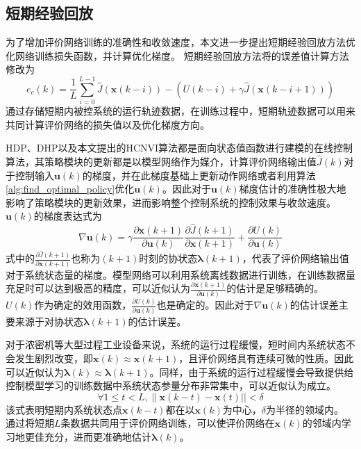 \subsection{短期经验回放}
为了增加评价网络训练的准确性和收敛速度，本文进一步提出短期经验回放方法优化网络训练损失函数，并计算优化梯度。
短期经验回放方法将的误差值计算方法修改为
\begin{equation}
\label{equ:TDerror_replay} e_{c}(k)=\frac{1}{L} \sum_{i=0}^{L-1}
\hat{J}(\pmb x(k-i)) - (U(k-i)+\gamma \hat{J}(\pmb x(k-i+1)))
\end{equation}
通过存储短期内被控系统的运行轨迹数据，在训练过程中，短期轨迹数据可以用来共同计算评价网络的损失值以及优化梯度方向。

HDP、DHP以及本文提出的HCNVI算法都是面向状态值函数进行建模的在线控制算法，其策略模块的更新都是以模型网络作为媒介，计算评价网络输出值$\hat{J}(k)$对于控制输入${\pmb
u}(k)$的梯度，并在此梯度基础上更新动作网络或者利用算法\ref{alg:find_optimal_policy}优化${\pmb
u}(k)$。因此对于${\pmb
u}(k)$梯度估计的准确性极大地影响了策略模块的更新效果，进而影响整个控制系统的控制效果与收敛速度。${\pmb
u}(k)$的梯度表达式为
\begin{equation}
\label{equ:uk_grad} \nabla \pmb u(k)=\gamma\frac{\partial \pmb
x(k+1)}{\partial \pmb u(k)}\frac{\partial\hat{J}(k+1)}{\partial \pmb
x(k+1)}+\frac{\partial U(k)}{\partial \pmb u(k)}
\end{equation}
式中的$\frac{\partial\hat{J}(k+1)}{\partial \pmb
x(k+1)}$也称为$(k+1)$时刻的协状态$\pmb
\lambda(k+1)$，代表了评价网络输出值对于系统状态量的梯度。模型网络可以利用系统离线数据进行训练，在训练数据量充足时可以达到极高的精度，可以近似认为$\frac{\partial
\pmb x(k+1)}{\partial \pmb u(k)}$的估计是足够精确的。
$U(k)$作为确定的效用函数，$\frac{\partial U(k)}{\partial \pmb
u(k)}$也是确定的。因此对于$\nabla \pmb
u(k)$的估计误差主要来源于对协状态$\pmb \lambda(k+1)$的估计误差。

对于浓密机等大型过程工业设备来说，系统的运行过程缓慢，短时间内系统状态不会发生剧烈改变，即$\pmb
x(k)\approx \pmb
x(k+1)$，且评价网络具有连续可微的性质。因此可以近似认为$\pmb
\lambda(k)\approx \pmb
\lambda(k+1)$。同样，由于系统的运行过程缓慢会导致提供给控制模型学习的训练数据中系统状态参量分布非常集中，可以近似认为成立。
\begin{equation}
\label{equ:x_equation} \forall 1 \leq t<L, \| \pmb x(k-t)-\pmb
x(t)||<\delta
\end{equation}
该式表明短期内系统状态点$\pmb x(k-t)$都在以$\pmb
x(k)$为中心，$\delta$为半径的领域内。
通过将短期$L$条数据共同用于评价网络训练，可以使评价网络在$\pmb
x(k)$的邻域内学习地更佳充分，进而更准确地估计$\pmb \lambda(k)$。

